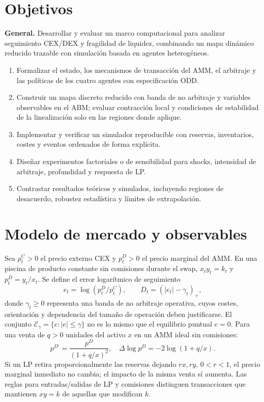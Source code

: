 \documentclass[11pt,a4paper]{article}
\begin{document}
\section{Objetivos}
\textbf{General.} Desarrollar y evaluar un marco computacional para analizar seguimiento CEX/DEX y fragilidad de liquidez, combinando un mapa dinámico reducido trazable con simulación basada en agentes heterogéneos.
\begin{enumerate}[leftmargin=*,itemsep=2pt]
\item Formalizar el estado, los mecanismos de transacción del AMM, el arbitraje y las políticas de los cuatro agentes con especificación ODD.
\item Construir un mapa discreto reducido con banda de no arbitraje y variables observables en el ABM; evaluar contracción local y condiciones de estabilidad de la linealización solo en las regiones donde aplique.
\item Implementar y verificar un simulador reproducible con reservas, inventarios, costes y eventos ordenados de forma explícita.
\item Diseñar experimentos factoriales o de sensibilidad para shocks, intensidad de arbitraje, profundidad y respuesta de LP.
\item Contrastar resultados teóricos y simulados, incluyendo regiones de desacuerdo, robustez estadística y límites de extrapolación.
\end{enumerate}
\section{Modelo de mercado y observables}
Sea $p_t^C>0$ el precio externo CEX y $p_t^D>0$ el precio marginal del AMM. En una piscina de producto constante sin comisiones durante el swap, $x_ty_t=k_t$ y $p_t^D=y_t/x_t$. Se define el error logarítmico de seguimiento
\begin{equation}
e_t=\log(p_t^D/p_t^C),\qquad D_t=(|e_t|-\gamma_t)_+,
\end{equation}
donde $\gamma_t\ge 0$ representa una banda de no arbitraje operativa, cuyos costes, orientación y dependencia del tamaño de operación deben justificarse. El conjunto $\mathcal{E}_{\gamma}=\{e:|e|\leq\gamma\}$ no es lo mismo que el equilibrio puntual $e=0$.
Para una venta de $q>0$ unidades del activo $x$ en un AMM ideal sin comisiones:
\begin{equation}
p^{D\prime}=\frac{p^D}{(1+q/x)^2},\quad \Delta\log p^D=-2\log(1+q/x).
\end{equation}
Si un LP retira proporcionalmente las reservas dejando $r x,r y$, $0<r<1$, el precio marginal inmediato no cambia; el impacto de la misma venta sí aumenta. Las reglas para entradas/salidas de LP y comisiones distinguen transacciones que mantienen $xy=k$ de aquellas que modifican $k$.
\end{document}
